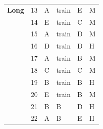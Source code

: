 \documentclass[pageno]{final_paper}
\begin{document}
\begin{table}[]
\begin{tabular}{@{}llllll@{}}
\textbf{Long}           & 13                                  & A                                          & train                                       & E                                           & M                                       \\
\textbf{}               & 14                                  & E                                          & train                                       & C                                           & M                                       \\
\textbf{}               & 15                                  & A                                          & train                                       & D                                           & M                                       \\
\textbf{}               & 16                                  & D                                          & train                                       & D                                           & H                                       \\
\textbf{}               & 17                                  & A                                          & train                                       & B                                           & M                                       \\
\textbf{}               & 18                                  & C                                          & train                                       & C                                           & M                                       \\
\textbf{}               & 19                                  & B                                          & train                                       & B                                           & H                                       \\
\textbf{}               & 20                                  & E                                          & train                                       & B                                           & M                                       \\
\textbf{}               & 21                                  & B                                          & B                                           & D                                           & H                                       \\
\textbf{}               & 22                                  & A                                          & B                                           & E                                           & H                                       \\

\end{tabular}
\end{table}
\end{document}
